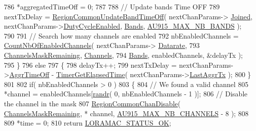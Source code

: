\begin{DoxyCode}
786         *aggregatedTimeOff = 0;
787 
788         \textcolor{comment}{// Update bands Time OFF}
789         nextTxDelay = \mbox{\hyperlink{group___r_e_g_i_o_n_c_o_m_m_o_n_ga2e26fe6b49ca26edf7052eadd7f18b3a}{RegionCommonUpdateBandTimeOff}}( nextChanParams->
      \mbox{\hyperlink{structs_next_chan_params_ac2f6caa0f3b02d2ac5056c3ee7c22652}{Joined}}, nextChanParams->\mbox{\hyperlink{structs_next_chan_params_a4d755868e0e80089462286c3ba6a6f18}{DutyCycleEnabled}}, \mbox{\hyperlink{_region_a_u915_8c_ae1fd88ab10531e31349da4c7fbff834c}{Bands}}, 
      \mbox{\hyperlink{group___r_e_g_i_o_n_a_u915_gad166b707f964b6b057ec3bb189c35ebc}{AU915\_MAX\_NB\_BANDS}} );
790 
791         \textcolor{comment}{// Search how many channels are enabled}
792         nbEnabledChannels = \mbox{\hyperlink{_region_a_u915_8c_a43fc7f3f4d15301eebe5c4a8b64b3f51}{CountNbOfEnabledChannels}}( nextChanParams->
      \mbox{\hyperlink{structs_next_chan_params_ae2f6080f3aa0e9485c55513ca56bb24d}{Datarate}},
793                                                       \mbox{\hyperlink{_region_a_u915_8c_a567333cec639a004655cc1717e9d0928}{ChannelsMaskRemaining}}, 
      \mbox{\hyperlink{_region_a_u915_8c_aef41de8bb5a74331478b9f755e713542}{Channels}},
794                                                       \mbox{\hyperlink{_region_a_u915_8c_ae1fd88ab10531e31349da4c7fbff834c}{Bands}}, enabledChannels, &delayTx );
795     \}
796     \textcolor{keywordflow}{else}
797     \{
798         delayTx++;
799         nextTxDelay = nextChanParams->\mbox{\hyperlink{structs_next_chan_params_a3609676d2d3b7c00e25615324b35cb26}{AggrTimeOff}} - 
      \mbox{\hyperlink{time_server_8c_a9ca7e27f3d6474daff63f2e093a2e91e}{TimerGetElapsedTime}}( nextChanParams->\mbox{\hyperlink{structs_next_chan_params_a381b728f60b185ecf3313e974c18768b}{LastAggrTx}} );
800     \}
801 
802     \textcolor{keywordflow}{if}( nbEnabledChannels > 0 )
803     \{
804         \textcolor{comment}{// We found a valid channel}
805         *channel = enabledChannels[\mbox{\hyperlink{utilities_8c_af5d8ad6dae489ac64821e7d4f004595d}{randr}}( 0, nbEnabledChannels - 1 )];
806         \textcolor{comment}{// Disable the channel in the mask}
807         \mbox{\hyperlink{group___r_e_g_i_o_n_c_o_m_m_o_n_ga695c0ab2a06edcae5b33772f639fb676}{RegionCommonChanDisable}}( \mbox{\hyperlink{_region_a_u915_8c_a567333cec639a004655cc1717e9d0928}{ChannelsMaskRemaining}}, *
      channel, \mbox{\hyperlink{group___r_e_g_i_o_n_a_u915_ga2b76c47d2463a72cc6c69a6384a6de11}{AU915\_MAX\_NB\_CHANNELS}} - 8 );
808 
809         *time = 0;
810         \textcolor{keywordflow}{return} \mbox{\hyperlink{group___l_o_r_a_m_a_c_gga1d18f26b344040b3ec5c3db662919661a03db5fca052313edb3823c014b653a74}{LORAMAC\_STATUS\_OK}};

\end{DoxyCode}

